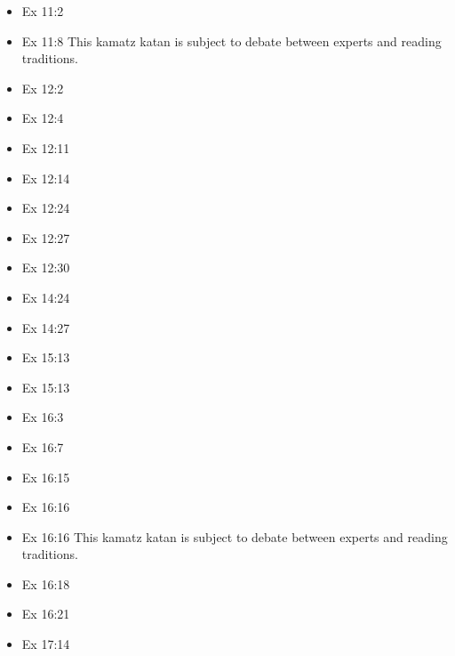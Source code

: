 \documentclass[14pt]{article}
\begin{document}
\begin{multicols}{2}
\begin{itemize}
\item Ex 11:2

\item Ex 11:8 This kamatz katan is subject to debate between experts and reading traditions.

\item Ex 12:2

\item Ex 12:4

\item Ex 12:11

\item Ex 12:14

\item Ex 12:24

\item Ex 12:27

\item Ex 12:30

\item Ex 14:24

\item Ex 14:27

\item Ex 15:13

\item Ex 15:13

\item Ex 16:3

\item Ex 16:7

\item Ex 16:15

\item Ex 16:16

\item Ex 16:16 This kamatz katan is subject to debate between experts and reading traditions.

\item Ex 16:18

\item Ex 16:21

\item Ex 17:14


\end{itemize}
\end{multicols}
\end{document}
